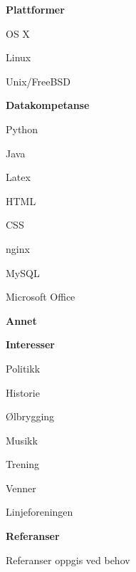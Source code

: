 \documentclass[a4paper,12pt,final]{memoir}
\newcommand{\Sep}{\vspace{1.5em}}
\newcommand{\SmallSep}{\vspace{0.5em}}
\newcommand{\CVSection}[1]
	{\Large\textbf{#1}\par
	\SmallSep\normalsize\normalfont}
\newcommand{\CVItem}[1]
	{\textbf{\color{RoyalBlue} #1}}
\begin{document}
\CVItem{Plattformer}
\begin{multicols}{3}
\begin{compactitem}[\color{RoyalBlue}$\circ$]
    \item OS X 
    \item Linux
    \item Unix/FreeBSD
\end{compactitem}
\end{multicols}
\SmallSep

\CVItem{Datakompetanse}
\begin{multicols}{3}
\begin{compactitem}[\color{RoyalBlue}$\circ$]
	\item Python 
	\item Java
	\item Latex 
	\item HTML
	\item CSS
	\item nginx 
	\item MySQL 
	\item Microsoft Office
\end{compactitem}
\end{multicols}
\SmallSep 

\CVSection{Annet}

\CVItem{Interesser}
\begin{multicols}{3}
\begin{compactitem}[\color{RoyalBlue}$\circ$]
	\item Politikk 
	\item Historie
	\item Ølbrygging 
	\item Musikk
	\item Trening
	\item Venner
	\item Linjeforeningen
\end{compactitem}
\end{multicols}
\Sep 

\CVSection{Referanser}
Referanser oppgis ved behov

\end{document}
